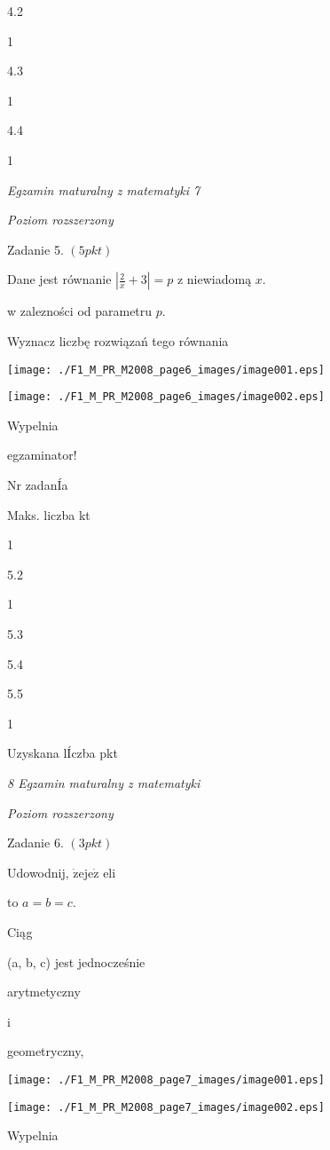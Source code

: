 \documentclass[a4paper,12pt]{article}
\begin{document}
4.2

1

4.3

1

4.4

1





{\it Egzamin maturalny z matematyki 7}

{\it Poziom rozszerzony}

Zadanie 5. $(5pkt)$

Dane jest równanie $|\displaystyle \frac{2}{x}+3|=p$ z niewiadomą $x.$

w zalezności od parametru $p.$

Wyznacz liczbę rozwiązań tego równania
\begin{center}
\texttt{[image: ./F1\_M\_PR\_M2008\_page6\_images/image001.eps]}

\texttt{[image: ./F1\_M\_PR\_M2008\_page6\_images/image002.eps]}
\end{center}
Wypelnia

egzaminator!

Nr zadanÍa

Maks. liczba kt

1

5.2

1

5.3

5.4

5.5

1

Uzyskana lÍczba pkt





{\it 8 Egzamin maturalny z matematyki}

{\it Poziom rozszerzony}

Zadanie 6. $(3pkt)$

Udowodnij, $\dot{\mathrm{z}}\mathrm{e} \mathrm{j}\mathrm{e}\dot{\mathrm{z}}$ eli

to $a=b=c.$

Ciąg

(a, b, c) jest jednocześnie

arytmetyczny

i

geometryczny,
\begin{center}
\texttt{[image: ./F1\_M\_PR\_M2008\_page7\_images/image001.eps]}

\texttt{[image: ./F1\_M\_PR\_M2008\_page7\_images/image002.eps]}
\end{center}
Wypelnia
\end{document}
